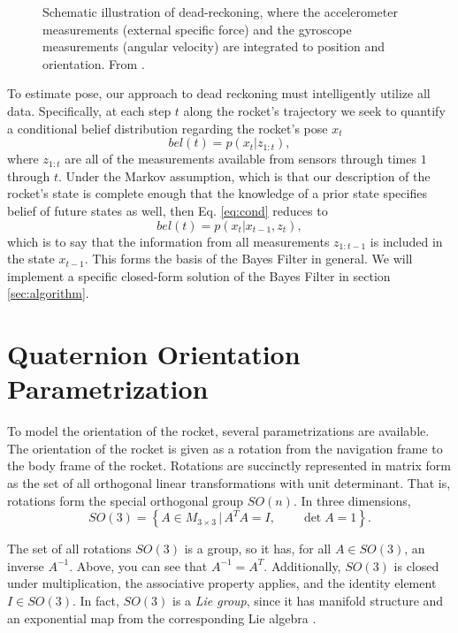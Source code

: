 \documentclass{article}
\begin{document}
\begin{figure}[ht]
  \centering
  \caption{Schematic illustration of dead-reckoning, where the accelerometer measurements (external specific force) and the gyroscope measurements (angular velocity) are integrated to position and orientation. From \cite{1}.}
  \label{fig:dr}
\end{figure}

To estimate pose, our approach to dead reckoning must intelligently utilize all data. Specifically, at each step $t$ along the rocket's trajectory we seek to quantify a conditional belief distribution regarding the rocket's pose $x_t$
\[ \label{eq:cond}
bel(t) = p(x_t | z_{1:t}),
\]
where $z_{1:t}$ are all of the measurements available from sensors through times $1$ through $t$. Under the Markov assumption, which is that our description of the rocket's state is complete enough that the knowledge of a prior state specifies belief of future states as well, then Eq. \ref{eq:cond} reduces to
\[
bel(t) = p(x_t | x_{t-1}, z_t),
\]
which is to say that the information from all measurements $z_{1:t-1}$ is included in the state $x_{t-1}$. This forms the basis of the Bayes Filter in general. We will implement a specific closed-form solution of the Bayes Filter in section \ref{sec:algorithm}.

\section{Quaternion Orientation Parametrization}
To model the orientation of the rocket, several parametrizations are available. The orientation of the rocket is given as a rotation from the navigation frame to the body frame of the rocket. Rotations are succinctly represented in matrix form as the set of all orthogonal linear transformations with unit determinant. That is, rotations form the special orthogonal group $SO(n)$. In three dimensions, 
\[
SO(3) = \left\{A \in M_{3\times 3} \,|\, A^TA = I, \qquad \det A = 1 \right\}.
\]

The set of all rotations $SO(3)$ is a group, so it has, for all $A \in SO(3)$, an inverse $A^{-1}$. Above, you can see that $A^{-1} = A^T$. Additionally, $SO(3)$ is closed under multiplication, the associative property applies, and the identity element $I \in SO(3)$. In fact, $SO(3)$ is a \textit{Lie group}, since it has manifold structure and an exponential map from the corresponding Lie algebra \cite{kok}.
\end{document}

